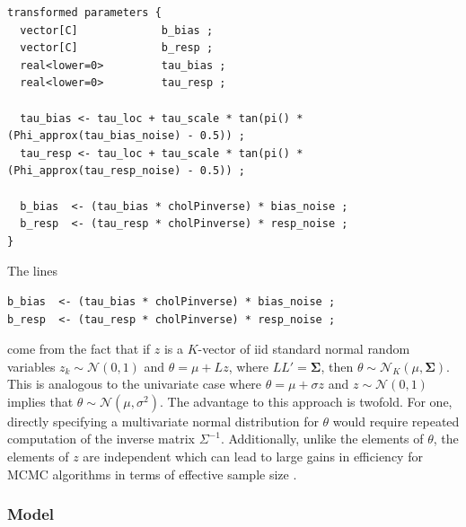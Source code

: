 \begin{singlespacing}
\small
\begin{verbatim}
transformed parameters {
  vector[C]             b_bias ;
  vector[C]             b_resp ;
  real<lower=0>         tau_bias ;
  real<lower=0>         tau_resp ;

  tau_bias <- tau_loc + tau_scale * tan(pi() * (Phi_approx(tau_bias_noise) - 0.5)) ;
  tau_resp <- tau_loc + tau_scale * tan(pi() * (Phi_approx(tau_resp_noise) - 0.5)) ;

  b_bias  <- (tau_bias * cholPinverse) * bias_noise ;
  b_resp  <- (tau_resp * cholPinverse) * resp_noise ;
}
\end{verbatim}
\end{singlespacing}

\noindent The lines
%
\begin{singlespacing}
\small
\begin{verbatim}
b_bias  <- (tau_bias * cholPinverse) * bias_noise ; 
b_resp  <- (tau_resp * cholPinverse) * resp_noise ; 
\end{verbatim}
\end{singlespacing}

\noindent come from the fact that if $z$ is a $K$-vector of iid standard normal random variables $z_k \sim \mathcal{N}(0,1)$ and $\theta = \mu + L z$, where $LL' = \boldsymbol{\Sigma}$, then $\theta \sim \mathcal{N}_K (\mu, \boldsymbol{\Sigma})$. This is analogous to the univariate case where $\theta = \mu + \sigma z$ and $z \sim \mathcal{N}(0,1)$ implies that $\theta \sim \mathcal{N}(\mu, \sigma^2)$. The advantage to this approach is twofold. For one, directly specifying a multivariate normal distribution for $\theta$ would require repeated computation of the inverse matrix $\Sigma^{-1}$. Additionally, unlike the elements of $\theta$, the elements of $z$ are independent which can lead to large gains in efficiency for MCMC algorithms in terms of effective sample size . 

\subsubsection{Model}

